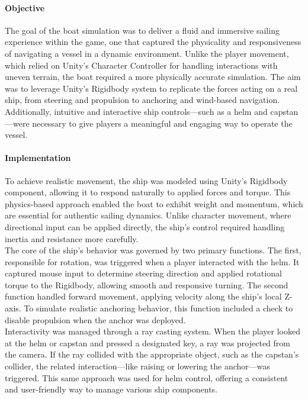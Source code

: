 \documentclass{article}
\begin{document}
\paragraph{Objective}\hfill

The goal of the boat simulation was to deliver a fluid and immersive sailing experience within the game, one that captured the physicality and responsiveness of navigating a vessel in a dynamic environment. Unlike the player movement, which relied on Unity's Character Controller for handling interactions with uneven terrain, the boat required a more physically accurate simulation. The aim was to leverage Unity's Rigidbody system to replicate the forces acting on a real ship, from steering and propulsion to anchoring and wind-based navigation. Additionally, intuitive and interactive ship controls—such as a helm and capstan—were necessary to give players a meaningful and engaging way to operate the vessel.

\paragraph{Implementation}\hfill

To achieve realistic movement, the ship was modeled using Unity's Rigidbody component, allowing it to respond naturally to applied forces and torque. This physics-based approach enabled the boat to exhibit weight and momentum, which are essential for authentic sailing dynamics. Unlike character movement, where directional input can be applied directly, the ship's control required handling inertia and resistance more carefully.\\

The core of the ship's behavior was governed by two primary functions. The first, responsible for rotation, was triggered when a player interacted with the helm. It captured mouse input to determine steering direction and applied rotational torque to the Rigidbody, allowing smooth and responsive turning. The second function handled forward movement, applying velocity along the ship's local Z-axis. To simulate realistic anchoring behavior, this function included a check to disable propulsion when the anchor was deployed.\\

Interactivity was managed through a ray casting system. When the player looked at the helm or capstan and pressed a designated key, a ray was projected from the camera. If the ray collided with the appropriate object, such as the capstan's collider, the related interaction—like raising or lowering the anchor—was triggered. This same approach was used for helm control, offering a consistent and user-friendly way to manage various ship components.\\
\end{document}
